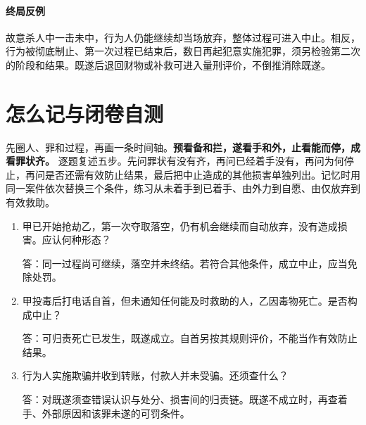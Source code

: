 \paragraph{终局反例}
故意杀人中一击未中，行为人仍能继续却当场放弃，整体过程可进入中止。相反，行为被彻底制止、第一次过程已结束后，数日再起犯意实施犯罪，须另检验第二次的阶段和结果。既遂后退回财物或补救可进入量刑评价，不倒推消除既遂。

\section*{怎么记与闭卷自测}
先圈人、罪和过程，再画一条时间轴。\textbf{预看备和拦，遂看手和外，止看能而停，成看罪状齐。} 逐题复述五步。先问罪状有没有齐，再问已经着手没有，再问为何停止，再问是否还需有效防止结果，最后把中止造成的其他损害单独列出。记忆时用同一案件依次替换三个条件，练习从未着手到已着手、由外力到自愿、由仅放弃到有效救助。
\begin{enumerate}
\item 甲已开始抢劫乙，第一次夺取落空，仍有机会继续而自动放弃，没有造成损害。应认何种形态？\par
答：同一过程尚可继续，落空并未终结。若符合其他条件，成立中止，应当免除处罚。
\item 甲投毒后打电话自首，但未通知任何能及时救助的人，乙因毒物死亡。是否构成中止？\par
答：可归责死亡已发生，既遂成立。自首另按其规则评价，不能当作有效防止结果。
\item 行为人实施欺骗并收到转账，付款人并未受骗。还须查什么？\par
答：对既遂须查错误认识与处分、损害间的归责链。既遂不成立时，再查着手、外部原因和该罪未遂的可罚条件。
\end{enumerate}
